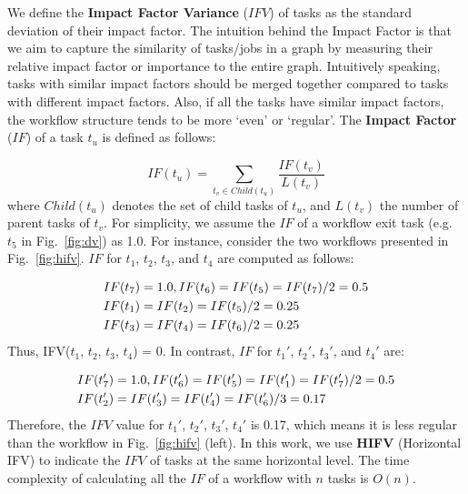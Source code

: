 \documentclass[final]{IEEEtran}
\begin{document}
We define the \textbf{Impact Factor Variance} ($IFV$) of tasks as the standard deviation of their impact factor. The intuition behind the Impact Factor is that we aim to capture the similarity of tasks/jobs in a graph by measuring their relative impact factor or importance to the entire graph. Intuitively speaking, tasks with similar impact factors should be merged together compared to tasks with different impact factors. Also, if all the tasks have similar impact factors, the workflow structure tends to be more `even' or `regular'. The \textbf{Impact Factor} ($IF$) of a task $t_u$ is defined as follows:


\begin{equation}
	IF(t_u)=\sum_{t_v\in Child(t_u)}^{}\frac{IF(t_v)}{L(t_v)}
\end{equation}
where $Child(t_u)$ denotes the set of child tasks of $t_u$, and $L(t_v)$ the number of parent tasks of $t_v$. For simplicity, we assume the $IF$ of a workflow exit task (e.g. $t_5$ in Fig.~\ref{fig:dv}) as 1.0. For instance, consider the two workflows presented in Fig.~\ref{fig:hifv}. $IF$ for $t_1$, $t_2$, $t_3$, and $t_4$ are computed as follows:

\begin{eqnarray}
	\displaystyle  
	&IF(t_7 )=1.0, IF(t_6 )=IF(t_5 )=IF(t_7 )/2=0.5\nonumber  \\
	&IF(t_1 )=IF(t_2 )=IF(t_5 )/2=0.25\nonumber \\
	&IF(t_3 )=IF(t_4 )=IF(t_6 )/2=0.25\nonumber 
\end{eqnarray}
Thus, IFV($t_1$, $t_2$, $t_3$, $t_4$) = 0. In contrast, $IF$ for $t_1'$, $t_2'$, $t_3'$, and $t_4'$ are:

\begin{eqnarray}
	\displaystyle  
	&IF(t_7')=1.0, IF(t_6')=IF(t_5')=IF(t_1')=IF(t_7')/2=0.5\nonumber \\
	&IF(t_2')=IF(t_3')=IF(t_4')=IF(t_6')/3=0.17 \nonumber
\end{eqnarray}
Therefore, the $IFV$ value for {$t_1'$, $t_2'$, $t_3'$, $t_4'$} is 0.17, which means it is less regular than the workflow in Fig.~\ref{fig:hifv} (left). In this work, we use \textbf{HIFV} (Horizontal IFV) to indicate the $IFV$ of tasks at the same horizontal level. The time complexity of calculating all the $IF$ of a workflow with $n$ tasks is $O(n)$.  
\end{document}
